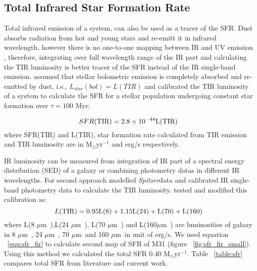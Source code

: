 \documentclass[useAMS,usenatbib]{mn2e}
\newcommand \um    {$\mu$m\ }
\newcommand \Spitzer {{\it Spitzer}}
\begin{document}
\subsection{Total Infrared Star Formation Rate}
\label{sec:sfr_fir}
Total infrared emission of a system, can also be used as a tracer of the SFR. Dust absorbs radiation from hot and young stars and re-emitt it in infrared wavelength, however there is no one-to-one mapping between IR and UV emission \citep{Calzeti12}, therefore, integrating over full wavelength range of the IR part and calculating the TIR luminosity is better tracer of the SFR instead of the IR single-band emission. \cite{Calzetti07} assumed that stellar bolometric emission is completely absorbed and re-emitted by dust, i.e., $L_{star}(bol) = L(TIR)$ and calibrated the TIR luminosity of a system to calculate the SFR for a stellar population undergoing constant star formation over $\tau = 100$ Myr:

\begin{equation}
\label{equ:sfr_fir}
SFR(\rm TIR) = 2.8 \times10^{-44}L(\rm TIR)
\end{equation}
where SFR(TIR) and L(TIR), star formation rate calculated from TIR emission and TIR luminosity are in M$_{\odot}$yr$^{-1}$ and erg/s respectively.


IR luminosity can be measured from integration of IR part of a spectral energy distribution (SED) of a galaxy or combining photometry datas in different IR wavelengths. For second approach \cite{Draine07} modelled \Spitzer data and calibrated IR single-band photometry data to calculate the TIR luminosity. \cite{Boquien10} tested and modified this calibration as:
\begin{equation}
 \label{equ: TIR}
L(\rm TIR) = 0.95L(8) + 1.15L(24) + L(70) + L(160)
\end{equation}
where L(8 \um),L(24 \um), L(70 \um) and L(160\um) are luminosities of galaxy in 8 \um, 24 \um, 70 \um and 160 \um in unit of erg/s. We used equation ~\ref{equ:sfr_fir} to calculate second map of SFR of M31 (figure ~\ref{fig:sfr_fir_small}). Using this method we calculated the total SFR 0.40  M$_{\odot}$yr$^{-1}$. Table ~\ref{table:sfr} compares total SFR from literature and current work.
\end{document}
